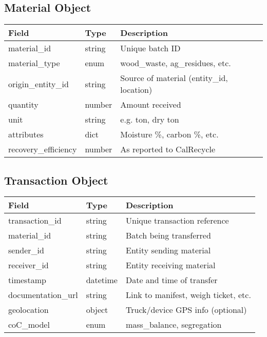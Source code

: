 \documentclass{article}
\begin{document}
\subsection*{Material Object}
\begin{longtable}{|p{3cm}|p{3cm}|p{8cm}|}
\hline
\textbf{Field} & \textbf{Type} & \textbf{Description} \\
\hline
material\_id & string & Unique batch ID \\
material\_type & enum & wood\_waste, ag\_residues, etc. \\
origin\_entity\_id & string & Source of material (entity\_id, location) \\
quantity & number & Amount received \\
unit & string & e.g. ton, dry ton \\
attributes & dict & Moisture \%, carbon \%, etc. \\
recovery\_efficiency & number & As reported to CalRecycle \\
\hline
\end{longtable}

\subsection*{Transaction Object}
\begin{longtable}{|p{3cm}|p{3cm}|p{8cm}|}
\hline
\textbf{Field} & \textbf{Type} & \textbf{Description} \\
\hline
transaction\_id & string & Unique transaction reference \\
material\_id & string & Batch being transferred \\
sender\_id & string & Entity sending material \\
receiver\_id & string & Entity receiving material \\
timestamp & datetime & Date and time of transfer \\
documentation\_url & string & Link to manifest, weigh ticket, etc. \\
geolocation & object & Truck/device GPS info (optional) \\
coC\_model & enum & mass\_balance, segregation \\
\hline
\end{longtable}
\end{document}
